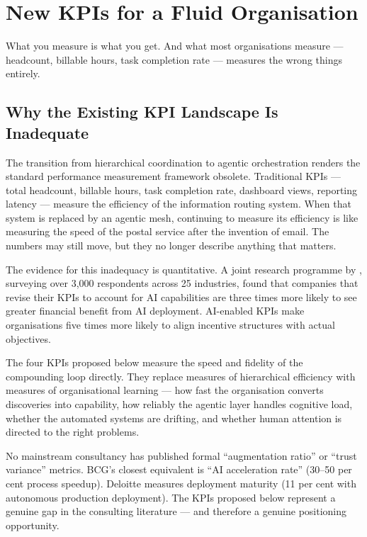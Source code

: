 \chapter{New KPIs for a Fluid Organisation}
\label{ch:new-kpis}

\epigraph{What you measure is what you get. And what most organisations measure --- headcount, billable hours, task completion rate --- measures the wrong things entirely.}{}

\section{Why the Existing KPI Landscape Is Inadequate}

The transition from hierarchical coordination to agentic orchestration renders the standard performance measurement framework obsolete. Traditional KPIs --- total headcount, billable hours, task completion rate, dashboard views, reporting latency --- measure the efficiency of the information routing system. When that system is replaced by an agentic mesh, continuing to measure its efficiency is like measuring the speed of the postal service after the invention of email. The numbers may still move, but they no longer describe anything that matters.

The evidence for this inadequacy is quantitative. A joint research programme by \textcite{BCGAIKPIs2025}, surveying over 3,000 respondents across 25 industries, found that companies that revise their KPIs to account for AI capabilities are three times more likely to see greater financial benefit from AI deployment. AI-enabled KPIs make organisations five times more likely to align incentive structures with actual objectives.

The four KPIs proposed below measure the speed and fidelity of the compounding loop directly. They replace measures of hierarchical efficiency with measures of organisational learning --- how fast the organisation converts discoveries into capability, how reliably the agentic layer handles cognitive load, whether the automated systems are drifting, and whether human attention is directed to the right problems.

\begin{keyinsight}
No mainstream consultancy has published formal ``augmentation ratio'' or ``trust variance'' metrics. BCG's closest equivalent is ``AI acceleration rate'' (30--50 per cent process speedup). Deloitte measures deployment maturity (11 per cent with autonomous production deployment). The KPIs proposed below represent a genuine gap in the consulting literature --- and therefore a genuine positioning opportunity.
\end{keyinsight}

